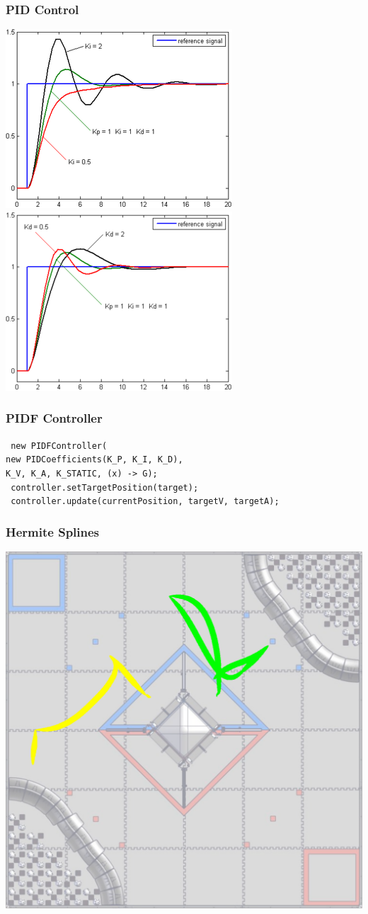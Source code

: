 \documentclass{beamer}
\begin{document}
\begin{frame}
	\frametitle{PID Control}
	\begin{centering} 
	\includegraphics[width=.45\textwidth]{i.png} 
	\hfill
	\includegraphics[width=.45\textwidth]{d.png}
	\end{centering}
\end{frame}

\begin{frame}
	\frametitle{PIDF Controller}
	\texttt{
        new PIDFController(\\
	new PIDCoefficients(K\_P, K\_I, K\_D),\\
	K\_V, K\_A, K\_STATIC, (x) -> G);
	}
	\\
	\vspace{1cm}
	\texttt{
		controller.setTargetPosition(target);
	}\\
	\texttt{
		controller.update(currentPosition, targetV, targetA);
		}

\end{frame}



\begin{frame}
	\frametitle{Hermite Splines}
	\centering
	\includegraphics[width=.6\textwidth]{path.png}

\end{frame}
\end{document}
